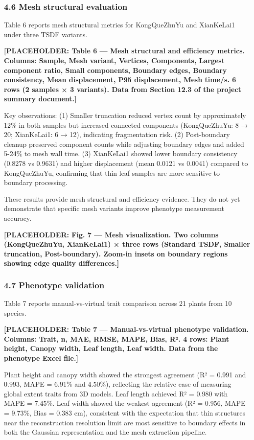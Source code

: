 \documentclass[11pt,a4paper]{article}
\begin{document}
\subsubsection{4.6 Mesh structural
evaluation}\label{mesh-structural-evaluation}

Table 6 reports mesh structural metrics for KongQueZhuYu and XianKeLai1
under three TSDF variants.

\textbf{{[}PLACEHOLDER: Table 6 --- Mesh structural and efficiency
metrics. Columns: Sample, Mesh variant, Vertices, Components, Largest
component ratio, Small components, Boundary edges, Boundary consistency,
Mean displacement, P95 displacement, Mesh time/s. 6 rows (2 samples × 3
variants). Data from Section 12.3 of the project summary document.{]}}

Key observations: (1) Smaller truncation reduced vertex count by
approximately 12\% in both samples but increased connected components
(KongQueZhuYu: 8 → 20; XianKeLai1: 6 → 12), indicating fragmentation
risk. (2) Post-boundary cleanup preserved component counts while
adjusting boundary edges and added 5-24\% to mesh wall time. (3)
XianKeLai1 showed lower boundary consistency (0.8278 vs 0.9631) and
higher displacement (mean 0.0121 vs 0.0041) compared to KongQueZhuYu,
confirming that thin-leaf samples are more sensitive to boundary
processing.

These results provide mesh structural and efficiency evidence. They do
not yet demonstrate that specific mesh variants improve phenotype
measurement accuracy.

\textbf{{[}PLACEHOLDER: Fig. 7 --- Mesh visualization. Two columns
(KongQueZhuYu, XianKeLai1) × three rows (Standard TSDF, Smaller
truncation, Post-boundary). Zoom-in insets on boundary regions showing
edge quality differences.{]}}

\subsubsection{4.7 Phenotype validation}\label{phenotype-validation}

Table 7 reports manual-vs-virtual trait comparison across 21 plants from
10 species.

\textbf{{[}PLACEHOLDER: Table 7 --- Manual-vs-virtual phenotype
validation. Columns: Trait, n, MAE, RMSE, MAPE, Bias, R². 4 rows: Plant
height, Canopy width, Leaf length, Leaf width. Data from the phenotype
Excel file.{]}}

Plant height and canopy width showed the strongest agreement (R² = 0.991
and 0.993, MAPE = 6.91\% and 4.50\%), reflecting the relative ease of
measuring global extent traits from 3D models. Leaf length achieved R² =
0.980 with MAPE = 7.45\%. Leaf width showed the weakest agreement (R² =
0.956, MAPE = 9.73\%, Bias = 0.383 cm), consistent with the expectation
that thin structures near the reconstruction resolution limit are most
sensitive to boundary effects in both the Gaussian representation and
the mesh extraction pipeline.
\end{document}
